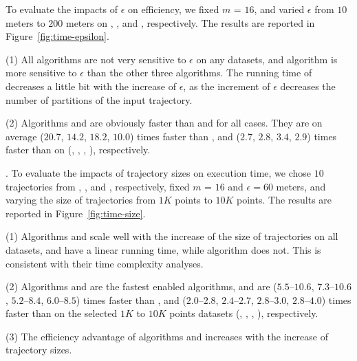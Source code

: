 To evaluate the impacts of $\epsilon$ on efficiency, we fixed $m$ = $16$, and varied $\epsilon$  from $10$ meters to $200$ meters on \truck, \sercar, \geolife and \pricar, respectively.
The results are reported in Figure~\ref{fig:time-epsilon}.

\ni(1) All algorithms are not very sensitive to $\epsilon$ on any datasets, and algorithm \dps is more sensitive to $\epsilon$ than the other three algorithms.
The running time of \dps decreases a little bit with the increase of $\epsilon$, as the increment of $\epsilon$ decreases the number of partitions of the input trajectory.


\ni(2) Algorithms \cist and \cista are obviously faster than \dps and \squishe for all cases.
They are on average ($20.7$, $14.2$, $18.2$, $10.0$) times faster than \dps, and ($2.7$, $2.8$, $3.4$, {$2.9$}) times faster than \squishe on (\truck, \sercar, {\geolife}, \pricar), respectively.


.
To evaluate the impacts of trajectory sizes on execution time,
we chose {$10$} trajectories from \truck, \sercar, \geolife and \pricar, respectively,
fixed $m$ = $16$ and $\epsilon = 60$ meters, and varying the size  of trajectories from $1K$ points to $10K$ points.
%
The results are reported in Figure~\ref{fig:time-size}.

\ni(1) Algorithms \cist and \cista scale well with the increase of the size of trajectories on all datasets,
and have a linear running time, while algorithm \dps does not.
This is consistent with their time complexity analyses.

\ni(2) Algorithms \cist and \cista are the fastest \sed enabled \lsa algorithms, and are {($5.5$--$10.6$, $7.3$--$10.6$, $5.2$--$8.4$, $6.0$--$8.5$)} times faster than \dps,
and {($2.0$--$2.8$, $2.4$--$2.7$, $2.8$--$3.0$, $2.8$--$4.0$)} times faster than \squishe on the selected $1K$ to $10K$ points datasets (\truck, \sercar, \geolife, \pricar), respectively.

\ni(3) The efficiency advantage of algorithms \cist and \cista increases with the increase of trajectory sizes.



